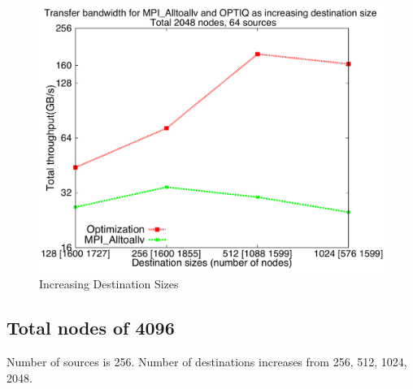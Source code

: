 \documentclass[letter]{article}
\begin{document}
\begin{figure}[h]
\vspace{-0.1in}
\centering
\includegraphics[scale=0.40]{report_figures/incrsize/incrsize_2k.pdf}
\vspace{-0.1in}
\caption{Increasing Destination Sizes}
\vspace{-0.1in}
\label{fig:incrsize_2k}
\end{figure}

\clearpage
\newpage






\clearpage
\newpage

\subsection{Total nodes of 4096}

Number of sources is 256. Number of destinations increases from 256, 512, 1024, 2048.
\end{document}
